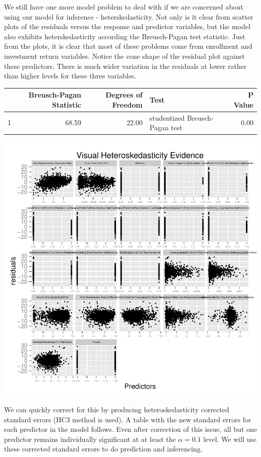 \documentclass{article}
\begin{document}
We still have one more model problem to deal with if we are concerned about using our model for inference - heterskedasticity. Not only is it clear from scatter plots of the residuals versus the response and predictor variables, but the model also exhibits heterskedasticity according the Breusch-Pagan test statistic. Just from the plots, it is clear that most of these problems come from enrollment and investment return variables. Notice the cone shape of the residual plot against these predictors. There is much wider variation in the residuals at lower rather than higher levels for these three variables.

\begin{table}[ht]
\centering
\begin{tabular}{rrrlr}
  \hline
 & Breusch-Pagan Statistic & Degrees of Freedom & Test & P Value \\ 
  \hline
1 & 68.59 & 22.00 & studentized Breusch-Pagan test & 0.00 \\ 
   \hline
\end{tabular}
\end{table}\includegraphics{Fig-bptest}

\FloatBarrier

We can quickly correct for this by producing heteroskedasticity corrected standard errors (HC3 method is used). A table with the new standard errors for each predictor in the model follows. Even after correction of this issue, all but one predictor remains individually significant at at least the $\alpha = 0.1$ level. We will use these corrected standard errors to do prediction and inferencing.
\end{document}
